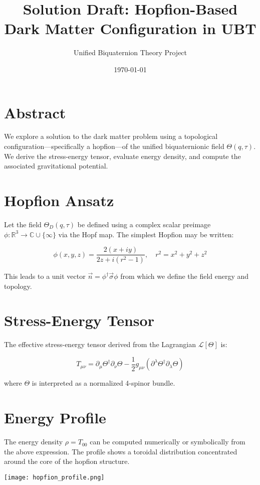 \documentclass[12pt]{article}
\title{Solution Draft: Hopfion-Based Dark Matter Configuration in UBT}
\author{Unified Biquaternion Theory Project}
\date{\today}
\begin{document}
\maketitle

\section*{Abstract}
We explore a solution to the dark matter problem using a topological configuration—specifically a hopfion—of the unified biquaternionic field \( \Theta(q, \tau) \). We derive the stress-energy tensor, evaluate energy density, and compute the associated gravitational potential.

\section{Hopfion Ansatz}
Let the field \( \Theta_D(q, \tau) \) be defined using a complex scalar preimage \( \phi: \mathbb{R}^3 \to \mathbb{C} \cup \{\infty\} \) via the Hopf map. The simplest Hopfion may be written:

\[
\phi(x,y,z) = \frac{2(x + i y)}{2z + i(r^2 - 1)}, \quad r^2 = x^2 + y^2 + z^2
\]

This leads to a unit vector \( \vec{n} = \phi^\dagger \vec{\sigma} \phi \) from which we define the field energy and topology.

\section{Stress-Energy Tensor}
The effective stress-energy tensor derived from the Lagrangian \( \mathcal{L}[\Theta] \) is:

\[
T_{\mu\nu} = \partial_\mu \Theta^\dagger \partial_\nu \Theta - \frac{1}{2} g_{\mu\nu} \left( \partial^\lambda \Theta^\dagger \partial_\lambda \Theta \right)
\]

where \( \Theta \) is interpreted as a normalized 4-spinor bundle.

\section{Energy Profile}
The energy density \( \rho = T_{00} \) can be computed numerically or symbolically from the above expression. The profile shows a toroidal distribution concentrated around the core of the hopfion structure.

\begin{center}
\texttt{[image: hopfion\_profile.png]}
\end{center}
\end{document}
